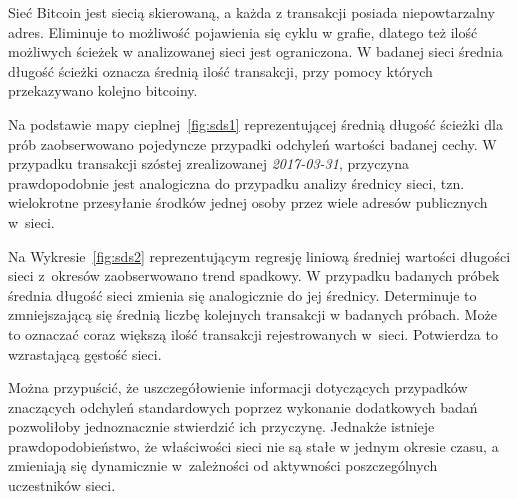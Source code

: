 \documentclass[12pt, oneside, final, openany]{mgr}
\begin{document}
\indent Sieć Bitcoin jest siecią skierowaną, a każda z transakcji posiada niepowtarzalny adres. Eliminuje to możliwość pojawienia się cyklu w grafie, dlatego też ilość możliwych ścieżek w analizowanej sieci jest ograniczona. W badanej sieci średnia długość ścieżki oznacza średnią ilość transakcji, przy pomocy których przekazywano kolejno bitcoiny.

\indent Na podstawie mapy cieplnej~\ref{fig:sds1} reprezentującej średnią długość ścieżki dla prób zaobserwowano pojedyncze przypadki odchyleń wartości badanej cechy. W przypadku transakcji szóstej zrealizowanej \textit{2017-03-31}, przyczyna prawdopodobnie jest analogiczna do przypadku analizy średnicy sieci, tzn. wielokrotne przesyłanie środków jednej osoby przez wiele adresów publicznych w~sieci.

\indent Na Wykresie~\ref{fig:sds2} reprezentującym regresję liniową średniej wartości długości sieci z~okresów zaobserwowano trend spadkowy. W przypadku badanych próbek średnia długość sieci zmienia się analogicznie do jej średnicy. Determinuje to zmniejszającą się średnią liczbę kolejnych transakcji w badanych próbach. Może to oznaczać coraz większą ilość transakcji rejestrowanych w~sieci. Potwierdza to wzrastającą gęstość sieci.

\indent Można przypuścić, że uszczegółowienie informacji dotyczących przypadków znaczących odchyleń standardowych poprzez wykonanie dodatkowych badań pozwoliłoby jednoznacznie stwierdzić ich przyczynę. Jednakże istnieje prawdopodobieństwo, że właściwości sieci nie są stałe w jednym okresie czasu, a zmieniają się dynamicznie w~zależności od aktywności poszczególnych uczestników sieci.
\end{document}
